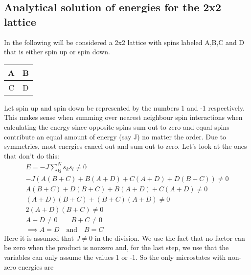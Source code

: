 \documentclass[a4paper, 12pt]{article}
\begin{document}
\subsection{Analytical solution of energies for the 2x2 lattice}
	In the following will be considered a 2x2 lattice with spins labeled A,B,C and D that is either spin up or spin down.
	\begin{center}
	\begin{tabular}{ | c | c | }
	\hline
	A & B \\ \hline
	C & D \\
	\hline
	\end{tabular}
	\end{center}
	Let spin up and spin down be represented by the numbers 1 and -1 respectively. This makes sense when summing over nearest neighbour spin interactions when calculating the energy since opposite spins sum out to zero and equal spins contribute an equal amount of energy (say J) no matter the order.
	Due to symmetries, most energies cancel out and sum out to zero. Let's look at the ones that don't do this:
	\begin{align*}
		E = -J\sum_{kl}^Ns_k s_l \neq 0\\
		-J(A(B+C)+B(A+D)+C(A+D)+D(B+C)) \neq 0\\
		A(B+C)+D(B+C)+B(A+D)+C(A+D) \neq 0 \\
		(A+D)(B+C)+(B+C)(A+D) \neq 0 \\
		2(A+D)(B+C) \neq 0 \\
		A+D \neq 0 \qquad B+C \neq 0 \\
		\implies A=D \quad \mathrm{and} \quad B=C
	\end{align*}
	Here it is assumed that $J\neq 0$ in the division. We use the fact that no factor can be zero when the product is nonzero and, for the last step, we use that the variables can only assume the values 1 or -1.
	So the only microstates with non-zero energies are
\end{document}
